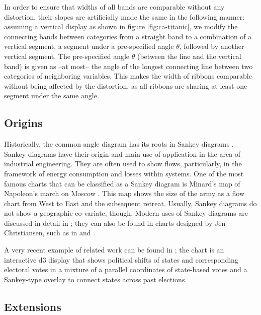 In order to ensure that  widths of all bands are  comparable without any distortion, their slopes  are artificially made the same in the following manner: 
assuming a vertical display as shown in figure \ref{fig:ca-titanic}, we modify  the connecting bands between  categories from a straight band  to a combination of a vertical  segment, a  segment under a pre-specified angle $\theta$, followed by another vertical  segment.  
The pre-specified angle $\theta$ (between the line and the vertical band) is given as --at most-- the angle of the longest connecting line between two categories of neighboring variables. 
This makes the width of ribbons  comparable without being affected by the distortion, as all ribbons are sharing at least one segment under the same angle. 

\subsection{Origins}
Historically, the common angle diagram has its roots in Sankey diagrams \citep{sankey:1898}. Sankey diagrams have their origin and main use of application in the area of industrial engineering. They are often used to show flows,  particularly, in the framework of energy consumption and losses within systems.
One of the most famous charts that can be classified as a Sankey diagram is Minard's map of Napoleon's march on Moscow \citep{minard:1812}. This map  shows the size of the army as a flow chart from West to East and the subsequent retreat. Usually, Sankey diagrams do not show a geographic co-variate, though. Modern uses of Sankey diagrams are discussed in  detail in \citep{schmidt:2008};  they can also be found in charts designed by Jen Christiansen, such as in \cite{jen3} and \cite{jen2}.

A very recent example of related work can be found in \citep{bostock:2012}; the chart is an interactive d3 display that shows political shifts of states and corresponding electoral votes in a mixture of a parallel coordinates of state-based votes and a Sankey-type overlay to connect states across past elections.


\subsection{Extensions}
